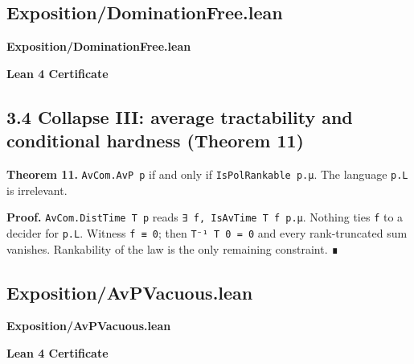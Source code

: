 \documentclass[11pt,a4paper]{article}
\begin{document}
\hypertarget{exposition-dominationfree-lean}{%
\subsection{Exposition/DominationFree.lean}\label{exposition-dominationfree-lean}}

\noindent\textbf{Exposition/DominationFree.lean}

\vspace{0.75\baselineskip}
\noindent\textcolor{green!40!black}{\textbf{Lean 4 Certificate}}\par\vspace{0.25\baselineskip}

\vspace{0.75\baselineskip}

\hypertarget{collapse-iii-average-tractability-and-conditional-hardness-theorem-11}{%
\subsection{3.4 Collapse III: average tractability and conditional hardness (Theorem 11)}\label{collapse-iii-average-tractability-and-conditional-hardness-theorem-11}}

\textbf{Theorem 11.} \texttt{AvCom.AvP\ p} if and only if \texttt{IsPolRankable\ p.μ}. The language \texttt{p.L} is irrelevant.

\textbf{Proof.} \texttt{AvCom.DistTime\ T\ p} reads \texttt{∃\ f,\ IsAvTime\ T\ f\ p.μ}. Nothing ties \texttt{f} to a decider for \texttt{p.L}. Witness \texttt{f\ ≡\ 0}; then \texttt{T⁻¹\ T\ 0\ =\ 0} and every rank-truncated sum vanishes. Rankability of the law is the only remaining constraint. ∎

\hypertarget{exposition-avpvacuous-lean}{%
\subsection{Exposition/AvPVacuous.lean}\label{exposition-avpvacuous-lean}}

\noindent\textbf{Exposition/AvPVacuous.lean}

\vspace{0.75\baselineskip}
\noindent\textcolor{green!40!black}{\textbf{Lean 4 Certificate}}\par\vspace{0.25\baselineskip}

\vspace{0.75\baselineskip}
\end{document}
